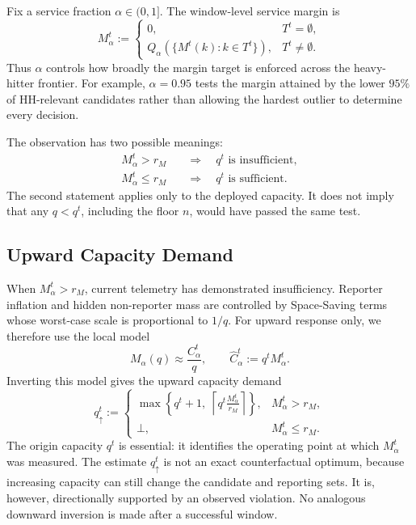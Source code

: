 \documentclass[sigconf, nonacm]{acmart}
\begin{document}
Fix a service fraction \(\alpha\in(0,1]\). The window-level service margin is
\begin{equation}
\label{eq:qreq-window}
M_\alpha^t
:=
\begin{cases}
0, & T^t=\emptyset,\\[0.5ex]
Q_\alpha\!\left(\{M^t(k):k\in T^t\}\right),
& T^t\neq\emptyset.
\end{cases}
\end{equation}
Thus \(\alpha\) controls how broadly the margin target is enforced across the heavy-hitter frontier. For example, \(\alpha=0.95\) tests the margin attained by the lower \(95\%\) of HH-relevant candidates rather than allowing the hardest outlier to determine every decision.

The observation has two possible meanings:
\begin{equation}
\label{eq:capacity-service-test}
\begin{aligned}
M_\alpha^t>r_M
&\quad\Longrightarrow\quad q^t\text{ is insufficient},\\
M_\alpha^t\le r_M
&\quad\Longrightarrow\quad q^t\text{ is sufficient}.
\end{aligned}
\end{equation}
The second statement applies only to the deployed capacity. It does not imply that any \(q<q^t\), including the floor \(n\), would have passed the same test.

\subsection{Upward Capacity Demand}
\label{subsec:req-window}

When \(M_\alpha^t>r_M\), current telemetry has demonstrated insufficiency. Reporter inflation and hidden non-reporter mass are controlled by Space-Saving terms whose worst-case scale is proportional to \(1/q\). For upward response only, we therefore use the local model
\[
M_\alpha(q)\approx\frac{C_\alpha^t}{q},
\qquad
\widehat C_\alpha^t:=q^tM_\alpha^t.
\]
Inverting this model gives the upward capacity demand
\begin{equation}
\label{eq:qreq-perkey}
q_\uparrow^t
:=
\begin{cases}
\max\!\left\{
q^t+1,\;
\left\lceil q^t\frac{M_\alpha^t}{r_M}\right\rceil
\right\},
& M_\alpha^t>r_M,\\[1ex]
\bot, & M_\alpha^t\le r_M.
\end{cases}
\end{equation}
The origin capacity \(q^t\) is essential: it identifies the operating point at which \(M_\alpha^t\) was measured. The estimate \(q_\uparrow^t\) is not an exact counterfactual optimum, because increasing capacity can still change the candidate and reporting sets. It is, however, directionally supported by an observed violation. No analogous downward inversion is made after a successful window.
\end{document}
